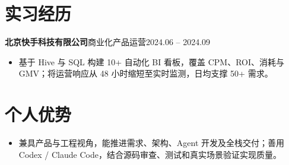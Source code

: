 \documentclass[10pt,a4paper]{article}
\newcommand{\datedsubsection}[2]{\noindent #1\hfill{\small #2}\par\vspace{1pt}}
\begin{document}
\section{实习经历}
\datedsubsection{\textbf{北京快手科技有限公司}\quad 商业化产品运营}{2024.06 -- 2024.09}
\begin{itemize}
  \item 基于 Hive 与 SQL 构建 10+ 自动化 BI 看板，覆盖 CPM、ROI、消耗与 GMV；将运营响应从 48 小时缩短至实时监测，日均支撑 50+ 需求。
\end{itemize}

\section{个人优势}
\begin{itemize}
  \item 兼具产品与工程视角，能推进需求、架构、Agent 开发及全栈交付；善用 Codex / Claude Code，结合源码审查、测试和真实场景验证实现质量。
\end{itemize}
\end{document}
